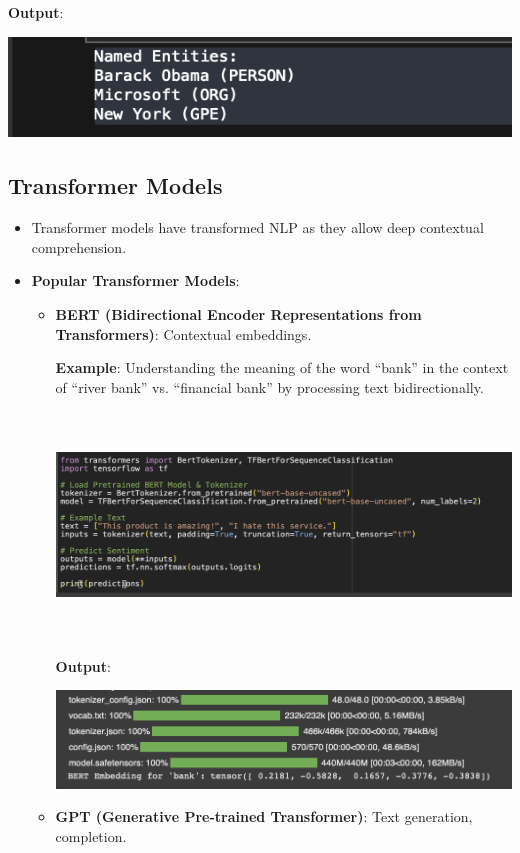 \documentclass{article}
\begin{document}
\begin{itemize}
\textbf{Output}:

\includegraphics[width=14cm,height=2
cm]{NER_Output.png}
\end{itemize}
\newpage
\subsection{Transformer Models}
\begin{itemize}
\item Transformer models have transformed NLP as they allow deep contextual comprehension.
\item \textbf{Popular Transformer Models}: 
\begin{itemize}
\item \textbf{BERT (Bidirectional Encoder Representations from Transformers)}: Contextual embeddings.

\textbf{Example}: Understanding the meaning of the word “bank” in the context of “river bank” vs. “financial bank” by processing text bidirectionally.

\includegraphics[width=14cm,height=6cm]{BERT.png}

\textbf{Output}:

\includegraphics[width=14cm,height=4
cm]{BERT_Output.png}
\item \textbf{GPT (Generative Pre-trained Transformer)}: Text generation, completion.


\end{itemize}
\end{itemize}
\end{document}
